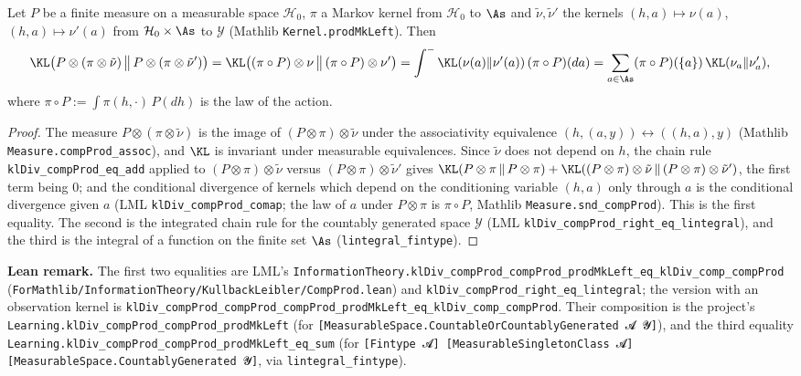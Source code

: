 \begin{lemma}\label{lem:pinfo_kl_step}
\leanok
Let $P$ be a finite measure on a measurable space $\mathcal H_0$, $\pi$ a Markov kernel from
$\mathcal H_0$ to $\As$ and $\tilde\nu, \tilde\nu'$ the kernels $(h, a) \mapsto \nu(a)$,
$(h, a) \mapsto \nu'(a)$ from $\mathcal H_0 \times \As$ to $\mathcal Y$ (Mathlib
\texttt{Kernel.prodMkLeft}). Then
\[
  \KL\big(P\otimes(\pi\otimes\tilde\nu)\,\big\|\,P\otimes(\pi\otimes\tilde\nu')\big)
  = \KL\big((\pi\circ P)\otimes\nu\,\big\|\,(\pi\circ P)\otimes\nu'\big)
  = \int^- \KL(\nu(a)\|\nu'(a))\,(\pi\circ P)(da)
  = \sum_{a\in\As} (\pi\circ P)(\{a\})\,\KL(\nu_a\|\nu'_a),
\]
where $\pi \circ P := \int \pi(h, \cdot)\,P(dh)$ is the law of the action.
\end{lemma}

\begin{proof}
\leanok
The measure $P \otimes (\pi \otimes \tilde\nu)$ is the image of $(P \otimes \pi) \otimes \tilde\nu$
under the associativity equivalence $(h, (a, y)) \leftrightarrow ((h, a), y)$ (Mathlib
\texttt{Measure.compProd\_assoc}), and $\KL$ is invariant under measurable equivalences. Since
$\tilde\nu$ does not depend on $h$, the chain rule \texttt{klDiv\_compProd\_eq\_add} applied to
$(P\otimes\pi)\otimes\tilde\nu$ versus $(P\otimes\pi)\otimes\tilde\nu'$ gives
$\KL(P\otimes\pi\,\|\,P\otimes\pi) + \KL((P\otimes\pi)\otimes\tilde\nu\,\|\,(P\otimes\pi)\otimes\tilde\nu') $,
the first term being $0$; and the conditional divergence of kernels which depend on the
conditioning variable $(h, a)$ only through $a$ is the conditional divergence given $a$
(LML \texttt{klDiv\_compProd\_comap}; the law of $a$ under $P\otimes\pi$ is
$\pi\circ P$, Mathlib \texttt{Measure.snd\_compProd}). This is the first equality. The second is
the integrated chain rule for the countably generated space $\mathcal Y$ (LML
\texttt{klDiv\_compProd\_right\_eq\_lintegral}), and the third is the integral of a function on
the finite set $\As$ (\texttt{lintegral\_fintype}).
\end{proof}

\textbf{Lean remark.} The first two equalities are LML's
\texttt{InformationTheory.klDiv\_compProd\_compProd\_prodMkLeft\_eq\_klDiv\_comp\_compProd}
(\texttt{ForMathlib/InformationTheory/KullbackLeibler/CompProd.lean}) and
\texttt{klDiv\_compProd\_right\_eq\_lintegral}; the version with an observation kernel is
\texttt{klDiv\_compProd\_compProd\_compProd\_prodMkLeft\_eq\_klDiv\_comp\_compProd}. Their
composition is the project's \texttt{Learning.klDiv\_compProd\_compProd\_prodMkLeft} (for
\texttt{[MeasurableSpace.CountableOrCountablyGenerated 𝓐 𝓨]}), and the third equality
\texttt{Learning.klDiv\_compProd\_compProd\_prodMkLeft\_eq\_sum} (for \texttt{[Fintype 𝓐]
[MeasurableSingletonClass 𝓐] [MeasurableSpace.CountablyGenerated 𝓨]}, via
\texttt{lintegral\_fintype}).

